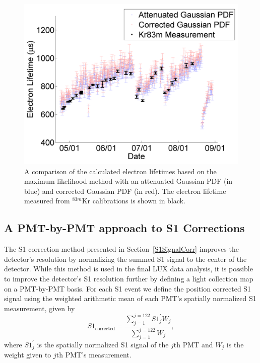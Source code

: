 \begin{figure}[h]\centering
\includegraphics[scale=0.6]{RadonLifetimeResults.png}
\caption{A comparison of the calculated electron lifetimes based on the maximum likelihood method with an attenuated Gaussian PDF (in blue) and corrected Gaussian PDF (in red).  The electron lifetime measured from $^{83m}$Kr calibrations is shown in black.}
\label{fig:RadonLifetimeResults}
\end{figure}



\subsection{A PMT-by-PMT approach to S1 Corrections}

The S1 correction method presented in Section~\ref{S1SignalCorr} improves the detector's resolution by normalizing the summed S1 signal to the center of the detector.  While this method is used in the final LUX data analysis, it is possible to improve the detector's S1 resolution further by defining a light collection map on a PMT-by-PMT basis.  For each S1 event we define the position corrected S1 signal using the weighted arithmetic mean of each PMT's spatially normalized S1 measurement, given by
\begin{equation} \label{WeightedMean}
S1_{\mbox{corrected}} = \frac{\sum_{j=1}^{j=122} S1^{\prime}_{j} W_{j}} {\sum_{j=1}^{j=122} W_{j}},
\end{equation}
where $S1^{\prime}_{j}$ is the spatially normalized S1 signal of the $j$th PMT and $W_j$ is the weight given to $j$th PMT's measurement.

